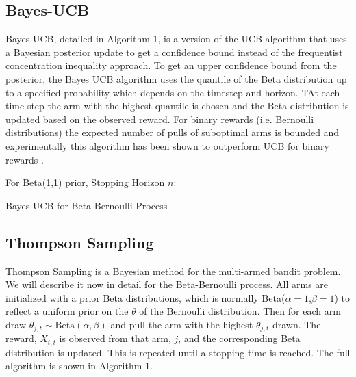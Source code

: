 \documentclass[journal,transmag]{IEEEtran}%
\begin{document}




\subsection{Bayes-UCB}
Bayes UCB, detailed in Algorithm 1, is a version of the UCB algorithm that uses a Bayesian posterior update to get a confidence bound instead of  the frequentist concentration inequality approach. To get an upper confidence bound from the posterior, the Bayes UCB algorithm uses the quantile of the Beta distribution up to a specified probability which depends on the timestep and horizon. TAt each time step the arm with the highest quantile is chosen and the Beta distribution is updated based on the observed reward.  For binary rewards (i.e. Bernoulli distributions) the expected number of pulls of suboptimal arms is bounded and experimentally this algorithm has been shown to outperform UCB for binary rewards \cite{kaufmann2012bayesian}.

\begin{algorithm}
 For Beta(1,1) prior, Stopping Horizon $n$: \\
 \caption{Bayes-UCB for Beta-Bernoulli Process}
\end{algorithm}


\subsection{Thompson Sampling}
Thompson Sampling is a Bayesian method for the multi-armed bandit problem. We will describe it now in detail for the Beta-Bernoulli process. All arms are initialized with a prior Beta distributions, which is normally Beta($\alpha=1$,$\beta =1$) to reflect a uniform prior on the $\theta$ of the Bernoulli distribution. Then for each arm draw $\theta_{j,t} \sim \mbox{Beta}(\alpha,\beta)$ and pull the arm with the highest $\theta_{j,t}$ drawn. The reward, $X_{i,t}$ is observed from that arm, $j$, and the corresponding Beta distribution is updated. This is repeated until a stopping time is reached. The full algorithm is shown in Algorithm 1.  
\end{document}

